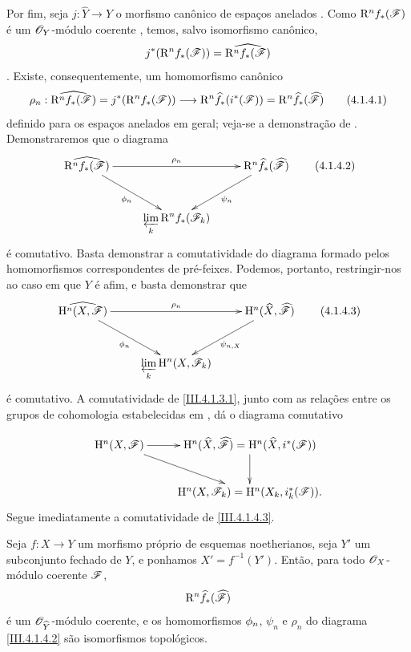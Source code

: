 \begin{env}[4.1.4]
\label{III.4.1.4}
Por fim, seja $j:\widehat{Y}\to Y$ o morfismo canônico de espaços
anelados .
Como $\mathrm{R}^n f_*(\mathscr{F})$ é um $\mathscr{O}_Y$-módulo coerente
, temos, salvo isomorfismo canônico,
\[
  j^*(\mathrm{R}^n f_*(\mathscr{F}))
  =
  \widehat{\mathrm{R}^n f_*(\mathscr{F})}
\]
.
Existe, consequentemente, um homomorfismo canônico
\[
  \rho_n:
  \widehat{\RR^n f_*(\sh{F})}
  =
  j^*(\RR^n f_*(\sh{F}))
  \longrightarrow
  \RR^n\widehat{f}_*(i^*(\sh{F}))
  =
  \RR^n\widehat{f}_*(\widehat{\sh{F}})
  \tag{4.1.4.1}
  \label{III.4.1.4.1}
\]
definido para os espaços anelados em geral; veja-se a demonstração
de .
Demonstraremos que o diagrama
\[
  \xymatrix{
    \widehat{\RR^n f_*(\sh{F})}
      \ar[rr]^{\rho_n}\ar[dr]_{\vphi_n}
    &&
    \RR^n\widehat{f}_*(\widehat{\sh{F}})
      \ar[dl]^{\psi_n}\\
    &
    \displaystyle\varprojlim_k\RR^n f_*(\sh{F}_k)
    &
  }
  \tag{4.1.4.2}
  \label{III.4.1.4.2}
\]
é comutativo.
Basta demonstrar a comutatividade do diagrama formado pelos
homomorfismos correspondentes de pré-feixes.
Podemos, portanto, restringir-nos ao caso em que $Y$ é afim, e basta
demonstrar que
\[
  \xymatrix{
    \widehat{\HH^n(X,\sh{F})}
      \ar[rr]^{\rho_n}\ar[dr]_{\vphi_n}
    &&
    \HH^n(\widehat{X},\widehat{\sh{F}})
      \ar[dl]^{\psi_{n,X}}\\
    &
    \displaystyle\varprojlim_k\HH^n(X,\sh{F}_k)
    &
  }
  \tag{4.1.4.3}
  \label{III.4.1.4.3}
\]
é comutativo.
A comutatividade de \eqref{III.4.1.3.1}, junto com as relações
entre os grupos de cohomologia estabelecidas em , dá
o diagrama comutativo


\[
  \xymatrix{
    \HH^n(X,\sh{F})
      \ar[r]\ar[dr]
    &
    \HH^n(\widehat{X},\widehat{\sh{F}})
      =
    \HH^n(\widehat{X},i^*(\sh{F}))
      \ar[d]\\
    &
    \HH^n(X,\sh{F}_k)
      =
    \HH^n(X_k,i_k^*(\sh{F})).
  }
\]
Segue imediatamente a comutatividade de \eqref{III.4.1.4.3}.
\end{env}

\begin{theorem}[4.1.5]
\label{III.4.1.5}
Seja $f:X\to Y$ um morfismo próprio de esquemas noetherianos, seja
$Y'$ um subconjunto fechado de $Y$, e ponhamos $X'=f^{-1}(Y')$.
Então, para todo $\mathscr{O}_X$-módulo coerente $\mathscr{F}$,
\[
  \mathrm{R}^n\widehat{f}_*(\widehat{\mathscr{F}})
\]
é um $\mathscr{O}_{\widehat{Y}}$-módulo coerente, e os homomorfismos
$\phi_n$, $\psi_n$ e $\rho_n$ do diagrama
\eqref{III.4.1.4.2} são isomorfismos topológicos.
\end{theorem}


